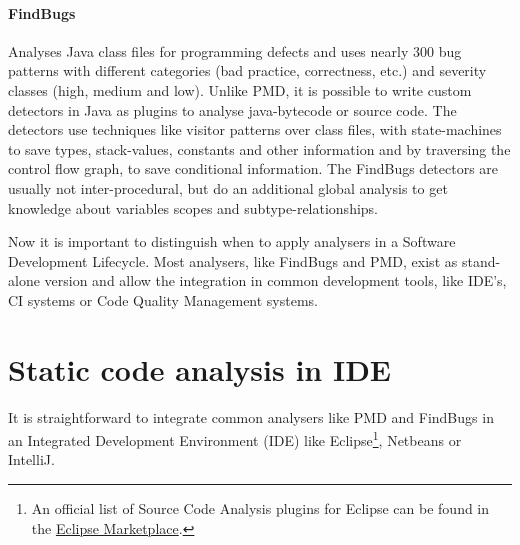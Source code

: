 \documentclass[conference]{IEEEtran}
\begin{document}
\paragraph{FindBugs}
Analyses Java class files for programming defects and uses nearly 300 bug patterns with different categories (bad practice, correctness, etc.) and severity classes (high, medium and low)\cite{Findbugs}.
Unlike PMD, it is possible to write custom detectors in Java as plugins to analyse java-bytecode or source code.
The detectors use techniques like visitor patterns over class files, with state-machines to save types, stack-values, constants and other information and by traversing the control flow graph, to save conditional information.
The FindBugs detectors are usually not inter-procedural, but do an additional global analysis to get knowledge about variables scopes and subtype-relationships.


Now it is important to distinguish when to apply analysers in a Software Development Lifecycle.
Most analysers, like FindBugs and PMD, exist as stand-alone version and allow the integration in common development tools, like IDE's, CI systems or Code Quality Management systems.







\section{Static code analysis in IDE}
\label{sec:static_code_analysis_ide}
It is straightforward to integrate common analysers like PMD and FindBugs in an Integrated Development Environment (IDE) like Eclipse\footnote{An official list of Source Code Analysis plugins for Eclipse can be found in the \href{http://marketplace.eclipse.org/taxonomy/term/14,31}{Eclipse Marketplace}.}, Netbeans or IntelliJ.
\end{document}
